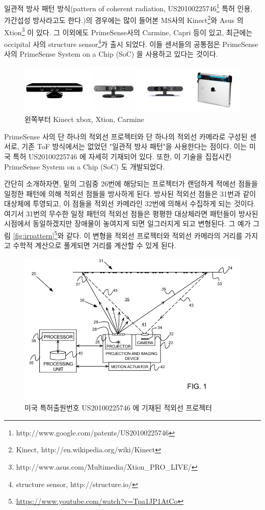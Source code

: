 일관적 방사 패턴 방식(pattern of coherent radiation, US20100225746\footnote{http://www.google.com/patents/US20100225746} 특허 인용, 가간섭성 방사라고도 한다.)의 경우에는 많이 들어본 MS사의 Kinect\footnote{Kinect, http://en.wikipedia.org/wiki/Kinect}와 Asus 의 Xtion\footnote{http://www.asus.com/Multimedia/Xtion\_PRO\_LIVE/} 이 있다. 그 이외에도 PrimeSense사의 Carmine, Capri 등이 있고, 최근에는 occipital 사의 structure sensor\footnote{structure sensor, http://structure.io/}가 출시 되었다. 이들 센서들의 공통점은 PrimeSense 사의 PrimeSense System on a Chip (SoC) 을 사용하고 있다는 것이다. 

\begin{figure}[h]
\centering\includegraphics[width=0.9\columnwidth]{pictures/chapter9/pattern.png}
\caption{왼쪽부터 Kinect xbox, Xtion, Carmine}
\end{figure}

PrimeSense 사의 단 하나의 적외선 프로젝터와 단 하나의 적외선 카메라로 구성된 센서로, 기존 ToF 방식에서는 없었던 "일관적 방사 패턴"을 사용한다는 점이다. 이는 미국 특허 US20100225746 에 자세히 기재되어 있다. 또한, 이 기술을 집접시킨 PrimeSense System on a Chip (SoC) 도 개발되었다. 

간단히 소개하자면, 밑의 그림중 26번에 해당되는 프로젝터가 랜덤하게 적에선 점들을 일정한 패턴에 의해 적외선 점들을 방사하게 된다. 방사된 적외선 점들은 31번과 같이 대상체에 투영되고, 이 점들을 적외선 카메라인 32번에 의해서 수집하게 되는 것이다. 여기서 31번의 무수한 일정 패턴의 적외선 점들은 평평한 대상체라면 패턴들이 방사된 시점에서 동일하겠지만 장애물이 놓여지게 되면 일그러지게 되고 변형된다. 그 예가 그림 \ref{fig:irpattern}\footnote{\url{https://www.youtube.com/watch?v=Tpa1JP1AtCo}}와 같다. 이 변형을 적외선 프로젝터와 적외선 카메라의 거리를 가지고 수학적 계산으로 풀게되면 거리를 계산할 수 있게 된다.

\begin{figure}[h]
\centering\includegraphics[width=0.8\columnwidth]{pictures/chapter9/US20100225746A1_20100909_D00001.png}
\caption{미국 특허출원번호 US20100225746 에 기재된 적외선 프로젝터}
\end{figure}

